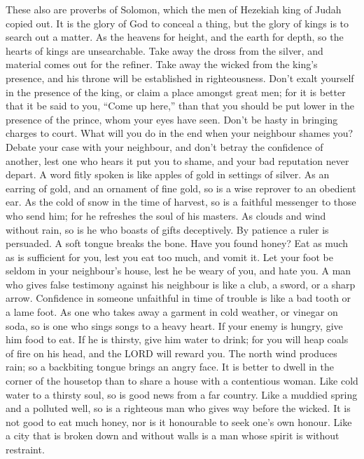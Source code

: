  These also are proverbs of Solomon, which the men of
Hezekiah king of Judah copied out.  It is the glory of God
to conceal a thing, but the glory of kings is to search out a matter.
 As the heavens for height, and the earth for depth, so
the hearts of kings are unsearchable.  Take away the dross
from the silver, and material comes out for the refiner. 
Take away the wicked from the king's presence, and his throne will be
established in righteousness.  Don't exalt yourself in the
presence of the king, or claim a place amongst great men; 
for it is better that it be said to you, ``Come up here,'' than that you
should be put lower in the presence of the prince, whom your eyes have
seen.  Don't be hasty in bringing charges to court. What
will you do in the end when your neighbour shames you? 
Debate your case with your neighbour, and don't betray the confidence of
another,  lest one who hears it put you to shame, and
your bad reputation never depart.  A word fitly spoken is
like apples of gold in settings of silver.  As an earring
of gold, and an ornament of fine gold, so is a wise reprover to an
obedient ear.  As the cold of snow in the time of
harvest, so is a faithful messenger to those who send him; for he
refreshes the soul of his masters.  As clouds and wind
without rain, so is he who boasts of gifts deceptively. 
By patience a ruler is persuaded. A soft tongue breaks the bone.
 Have you found honey? Eat as much as is sufficient for
you, lest you eat too much, and vomit it.  Let your foot
be seldom in your neighbour's house, lest he be weary of you, and hate
you.  A man who gives false testimony against his
neighbour is like a club, a sword, or a sharp arrow. 
Confidence in someone unfaithful in time of trouble is like a bad tooth
or a lame foot.  As one who takes away a garment in cold
weather, or vinegar on soda, so is one who sings songs to a heavy heart.
 If your enemy is hungry, give him food to eat. If he is
thirsty, give him water to drink;  for you will heap
coals of fire on his head, and the LORD will reward you. 
The north wind produces rain; so a backbiting tongue brings an angry
face.  It is better to dwell in the corner of the
housetop than to share a house with a contentious woman. 
Like cold water to a thirsty soul, so is good news from a far country.
 Like a muddied spring and a polluted well, so is a
righteous man who gives way before the wicked.  It is not
good to eat much honey, nor is it honourable to seek one's own honour.
 Like a city that is broken down and without walls is a
man whose spirit is without restraint.


